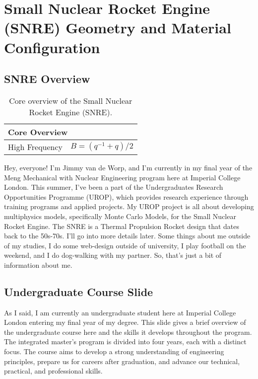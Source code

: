 \documentclass[8pt,a5paper]{article}
\begin{document}

\small

\section*{Small Nuclear Rocket Engine (SNRE) Geometry and Material Configuration}

\subsection*{SNRE Overview}

\begin{table}[h!]
    \label{table: Table 1}
    \centering
    \begin{tabular}{|l|l|}
    \hline
    \multicolumn{2}{|l|}{\textbf{Core Overview}}\\\hline
    High Frequency & $B = (q^{-1} + q)/2$\\\hline
    \end{tabular}
    \caption{Core overview of the Small Nuclear Rocket Engine (SNRE).}
\end{table}

Hey, everyone! I'm Jimmy van de Worp, and I'm currently in my final year of the Meng Mechanical with Nuclear Engineering program here at Imperial College London. This summer, I've been a part of the Undergraduates Research Opportunities Programme (UROP), which provides research experience through training programs and applied projects. My UROP project is all about developing multiphysics models, specifically Monte Carlo Models, for the Small Nuclear Rocket Engine. The SNRE is a Thermal Propulsion Rocket design that dates back to the 50s-70s. I'll go into more details later. Some things about me outside of my studies, I do some web-design outside of university, I play football on the weekend, and I do dog-walking with my partner. So, that's just a bit of information about me.

\subsection*{Undergraduate Course Slide}

As I said, I am currently an undergraduate student here at Imperial College London entering my final year of my degree. This slide gives a brief overview of the undergraduate course here and the skills it develops throughout the program. The integrated master's program is divided into four years, each with a distinct focus. The course aims to develop a strong understanding of engineering principles, prepare us for careers after graduation, and advance our technical, practical, and professional skills. \\
\end{document}
